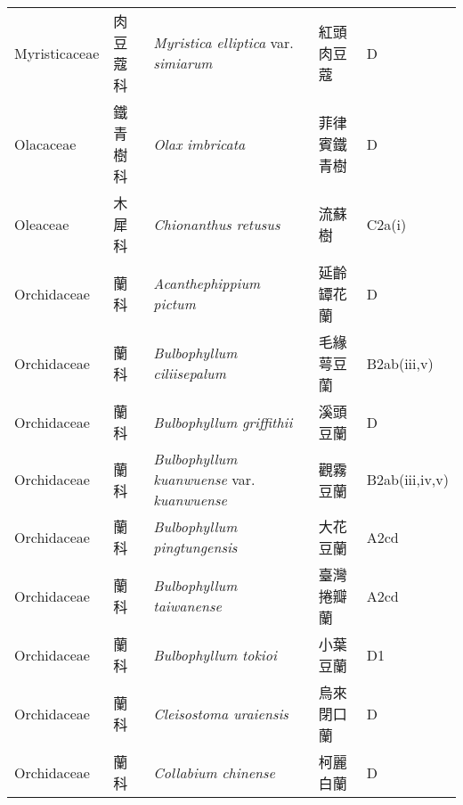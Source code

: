 {\begin{longtable}{p{2.5cm}p{2.5cm}p{4.5cm}p{2.5cm}p{3cm}}
    Myristicaceae & 肉豆蔻科 & \textit{Myristica elliptica} var. \textit{simiarum}  & 紅頭肉豆蔻 & D \index{Myristica@\textit{Myristica}!elliptica@\textit{elliptica}!var. simiarum@var. \textit{simiarum}}  \index{紅頭肉豆蔻} \\
    Olacaceae & 鐵青樹科 & \textit{Olax imbricata}  & 菲律賓鐵青樹 & D \index{Olax@\textit{Olax}!imbricata@\textit{imbricata}}  \index{菲律賓鐵青樹} \\
    Oleaceae & 木犀科 & \textit{Chionanthus retusus}  & 流蘇樹 & C2a(i) \index{Chionanthus@\textit{Chionanthus}!retusus@\textit{retusus}}  \index{流蘇樹} \\
    Orchidaceae & 蘭科 & \textit{Acanthephippium pictum}  & 延齡罈花蘭 & D \index{Acanthephippium@\textit{Acanthephippium}!pictum@\textit{pictum}}  \index{延齡罈花蘭} \\
    Orchidaceae & 蘭科 & \textit{Bulbophyllum ciliisepalum}  & 毛緣萼豆蘭 & B2ab(iii,v) \index{Bulbophyllum@\textit{Bulbophyllum}!ciliisepalum@\textit{ciliisepalum}}  \index{毛緣萼豆蘭} \\
    Orchidaceae & 蘭科 & \textit{Bulbophyllum griffithii}  & 溪頭豆蘭 & D \index{Bulbophyllum@\textit{Bulbophyllum}!griffithii@\textit{griffithii}}  \index{溪頭豆蘭} \\
    Orchidaceae & 蘭科 & \textit{Bulbophyllum kuanwuense} var. \textit{kuanwuense}  & 觀霧豆蘭 & B2ab(iii,iv,v) \index{Bulbophyllum@\textit{Bulbophyllum}!kuanwuense@\textit{kuanwuense}!var. kuanwuense@var. \textit{kuanwuense}}  \index{觀霧豆蘭} \\
    Orchidaceae & 蘭科 & \textit{Bulbophyllum pingtungensis}  & 大花豆蘭 & A2cd \index{Bulbophyllum@\textit{Bulbophyllum}!pingtungensis@\textit{pingtungensis}}  \index{大花豆蘭} \\
    Orchidaceae & 蘭科 & \textit{Bulbophyllum taiwanense}  & 臺灣捲瓣蘭 & A2cd \index{Bulbophyllum@\textit{Bulbophyllum}!taiwanense@\textit{taiwanense}}  \index{臺灣捲瓣蘭} \\
    Orchidaceae & 蘭科 & \textit{Bulbophyllum tokioi}  & 小葉豆蘭 & D1 \index{Bulbophyllum@\textit{Bulbophyllum}!tokioi@\textit{tokioi}}  \index{小葉豆蘭} \\
    Orchidaceae & 蘭科 & \textit{Cleisostoma uraiensis}  & 烏來閉口蘭 & D \index{Cleisostoma@\textit{Cleisostoma}!uraiensis@\textit{uraiensis}}  \index{烏來閉口蘭} \\
    Orchidaceae & 蘭科 & \textit{Collabium chinense}  & 柯麗白蘭 & D \index{Collabium@\textit{Collabium}!chinense@\textit{chinense}}  \index{柯麗白蘭} \\

\end{longtable}}
